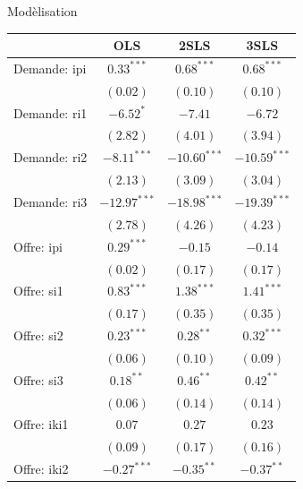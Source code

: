 \documentclass[11pt,ignorenonframetext,]{beamer}
\begin{document}
\begin{frame}{Modèlisation}
\protect\hypertarget{modelisation-1}{}

\tiny

\begin{table}[!htbp]
\begin{center}
\begin{tabular}{l c c c }
\hline
 & OLS & 2SLS & 3SLS \\
\hline
Demande: ipi        & $0.33^{***}$   & $0.68^{***}$   & $0.68^{***}$   \\
                    & $(0.02)$       & $(0.10)$       & $(0.10)$       \\
Demande: ri1        & $-6.52^{*}$    & $-7.41$        & $-6.72$        \\
                    & $(2.82)$       & $(4.01)$       & $(3.94)$       \\
Demande: ri2        & $-8.11^{***}$  & $-10.60^{***}$ & $-10.59^{***}$ \\
                    & $(2.13)$       & $(3.09)$       & $(3.04)$       \\
Demande: ri3        & $-12.97^{***}$ & $-18.98^{***}$ & $-19.39^{***}$ \\
                    & $(2.78)$       & $(4.26)$       & $(4.23)$       \\
Offre: ipi          & $0.29^{***}$   & $-0.15$        & $-0.14$        \\
                    & $(0.02)$       & $(0.17)$       & $(0.17)$       \\
Offre: si1          & $0.83^{***}$   & $1.38^{***}$   & $1.41^{***}$   \\
                    & $(0.17)$       & $(0.35)$       & $(0.35)$       \\
Offre: si2          & $0.23^{***}$   & $0.28^{**}$    & $0.32^{***}$   \\
                    & $(0.06)$       & $(0.10)$       & $(0.09)$       \\
Offre: si3          & $0.18^{**}$    & $0.46^{**}$    & $0.42^{**}$    \\
                    & $(0.06)$       & $(0.14)$       & $(0.14)$       \\
Offre: iki1         & $0.07$         & $0.27$         & $0.23$         \\
                    & $(0.09)$       & $(0.17)$       & $(0.16)$       \\
Offre: iki2         & $-0.27^{***}$  & $-0.35^{**}$   & $-0.37^{**}$   \\

\end{tabular}
\end{center}
\end{table}
\end{frame}
\end{document}
